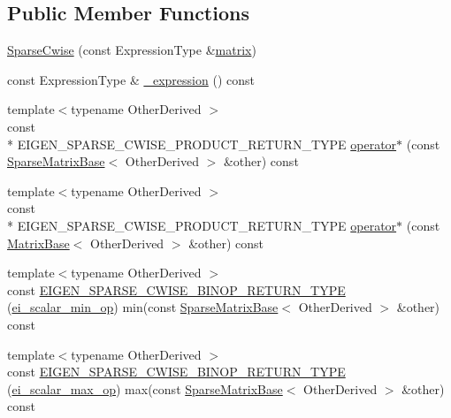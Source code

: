 \subsection*{Public Member Functions}
\begin{DoxyCompactItemize}
\item 
\hyperlink{class_sparse_cwise_a2e4073b02197195a180ca72ef1d0fecd}{Sparse\-Cwise} (const Expression\-Type \&\hyperlink{glext_8h_a7b24a3f2f56eb1244ae69dacb4fecb6f}{matrix})
\item 
const Expression\-Type \& \hyperlink{class_sparse_cwise_a571eb5287e3e7b22a2aac5108fb3657b}{\-\_\-expression} () const 
\item 
{\footnotesize template$<$typename Other\-Derived $>$ }\\const \\*
E\-I\-G\-E\-N\-\_\-\-S\-P\-A\-R\-S\-E\-\_\-\-C\-W\-I\-S\-E\-\_\-\-P\-R\-O\-D\-U\-C\-T\-\_\-\-R\-E\-T\-U\-R\-N\-\_\-\-T\-Y\-P\-E \hyperlink{class_sparse_cwise_a412ca9b22980fc542045d46764e8675d}{operator$\ast$} (const \hyperlink{class_sparse_matrix_base}{Sparse\-Matrix\-Base}$<$ Other\-Derived $>$ \&other) const 
\item 
{\footnotesize template$<$typename Other\-Derived $>$ }\\const \\*
E\-I\-G\-E\-N\-\_\-\-S\-P\-A\-R\-S\-E\-\_\-\-C\-W\-I\-S\-E\-\_\-\-P\-R\-O\-D\-U\-C\-T\-\_\-\-R\-E\-T\-U\-R\-N\-\_\-\-T\-Y\-P\-E \hyperlink{class_sparse_cwise_addb803d16fb1a5e139b161c04a9f5e2b}{operator$\ast$} (const \hyperlink{class_matrix_base}{Matrix\-Base}$<$ Other\-Derived $>$ \&other) const 
\item 
{\footnotesize template$<$typename Other\-Derived $>$ }\\const \hyperlink{class_sparse_cwise_a8fc1281781a4b3df9244cbbb6dc139ff}{E\-I\-G\-E\-N\-\_\-\-S\-P\-A\-R\-S\-E\-\_\-\-C\-W\-I\-S\-E\-\_\-\-B\-I\-N\-O\-P\-\_\-\-R\-E\-T\-U\-R\-N\-\_\-\-T\-Y\-P\-E} (\hyperlink{structei__scalar__min__op}{ei\-\_\-scalar\-\_\-min\-\_\-op}) min(const \hyperlink{class_sparse_matrix_base}{Sparse\-Matrix\-Base}$<$ Other\-Derived $>$ \&other) const 
\item 
{\footnotesize template$<$typename Other\-Derived $>$ }\\const \hyperlink{class_sparse_cwise_aa17f70cf4dfc0f451972453f5736a6ee}{E\-I\-G\-E\-N\-\_\-\-S\-P\-A\-R\-S\-E\-\_\-\-C\-W\-I\-S\-E\-\_\-\-B\-I\-N\-O\-P\-\_\-\-R\-E\-T\-U\-R\-N\-\_\-\-T\-Y\-P\-E} (\hyperlink{structei__scalar__max__op}{ei\-\_\-scalar\-\_\-max\-\_\-op}) max(const \hyperlink{class_sparse_matrix_base}{Sparse\-Matrix\-Base}$<$ Other\-Derived $>$ \&other) const 

\end{DoxyCompactItemize}
